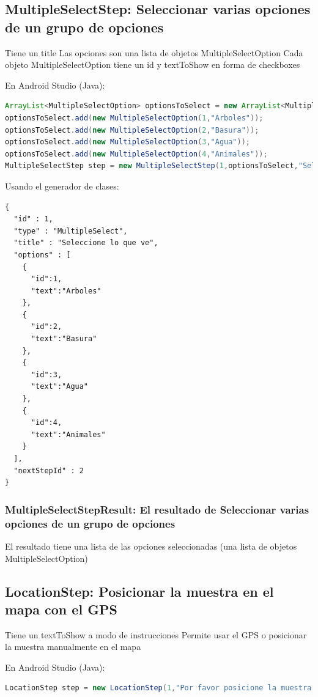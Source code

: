 \subsection{MultipleSelectStep: Seleccionar varias opciones de un grupo de opciones}
Tiene un title
Las opciones son una lista de objetos MultipleSelectOption
Cada objeto MultipleSelectOption tiene un id y textToShow
en forma de checkboxes

En Android Studio (Java):
\begin{lstlisting}[language=Java, frame=tlb]	
ArrayList<MultipleSelectOption> optionsToSelect = new ArrayList<MultipleSelectOption>();
optionsToSelect.add(new MultipleSelectOption(1,"Arboles"));
optionsToSelect.add(new MultipleSelectOption(2,"Basura"));
optionsToSelect.add(new MultipleSelectOption(3,"Agua"));
optionsToSelect.add(new MultipleSelectOption(4,"Animales"));
MultipleSelectStep step = new MultipleSelectStep(1,optionsToSelect,"Seleccione lo que ve",2); 
\end{lstlisting}

Usando el generador de clases:
\begin{lstlisting}[language=XML, frame=tlb]	
{
  "id" : 1,
  "type" : "MultipleSelect",
  "title" : "Seleccione lo que ve",
  "options" : [
    {
      "id":1,
      "text":"Arboles"
    },
    {
      "id":2,
      "text":"Basura"
    },
    {
      "id":3,
      "text":"Agua"
    },
    {
      "id":4,
      "text":"Animales"
    }
  ],
  "nextStepId" : 2
}
\end{lstlisting}

\subsubsection{MultipleSelectStepResult: El resultado de Seleccionar varias opciones de un grupo de opciones}
El resultado tiene una lista de las opciones seleccionadas (una lista de objetos MultipleSelectOption)



\subsection{LocationStep: Posicionar la muestra en el mapa con el GPS}
Tiene un textToShow a modo de instrucciones
Permite usar el GPS o posicionar la muestra manualmente en el mapa

En Android Studio (Java):
\begin{lstlisting}[language=Java, frame=tlb]	
LocationStep step = new LocationStep(1,"Por favor posicione la muestra en el mapa",2); 
\end{lstlisting}

